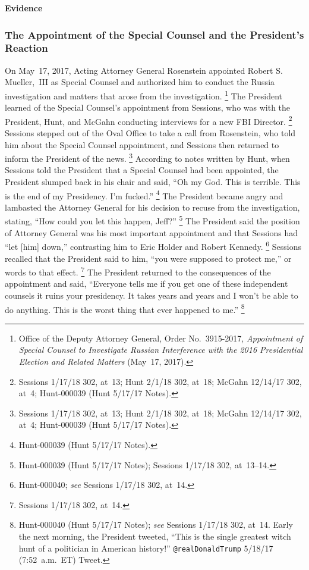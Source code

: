 \begin{center}
\textbf{Evidence}
\end{center}

\subsubsection{The Appointment of the Special Counsel and the President's Reaction}

On May~17, 2017, Acting Attorney General Rosenstein appointed Robert S. Mueller,~III as Special Counsel and authorized him to conduct the Russia investigation and matters that arose from the investigation.%
\footnote{Office of the Deputy Attorney General, Order No.~3915-2017, \textit{Appointment of Special Counsel to Investigate Russian Interference with the 2016 Presidential Election and Related Matters} (May~17, 2017).}
The President learned of the Special Counsel's appointment from Sessions, who was with the President, Hunt, and McGahn conducting interviews for a new FBI Director.%
\footnote{Sessions 1/17/18 302, at~13;
Hunt 2/1/18 302, at~18;
McGahn 12/14/17 302, at~4;
Hunt-000039 (Hunt 5/17/17 Notes).}
Sessions stepped out of the Oval Office to take a call from Rosenstein, who told him about the Special Counsel appointment, and Sessions then returned to inform the President of the news.%
\footnote{Sessions 1/17/18 302, at~13;
Hunt 2/1/18 302, at~18;
McGahn 12/14/17 302, at~4;
Hunt-000039 (Hunt 5/17/17 Notes).}
According to notes written by Hunt, when Sessions told the President that a Special Counsel had been appointed, the President slumped back in his chair and said, ``Oh my God.
This is terrible.
This is the end of my Presidency.
I'm fucked.''%
\footnote{Hunt-000039 (Hunt 5/17/17 Notes).}
The President became angry and lambasted the Attorney General for his decision to recuse from the investigation, stating, ``How could you let this happen, Jeff?''%
\footnote{Hunt-000039 (Hunt 5/17/17 Notes);
Sessions 1/17/18 302, at~13--14.}
The President said the position of Attorney General was his most important appointment and that Sessions had ``let [him] down,'' contrasting him to Eric Holder and Robert Kennedy.%
\footnote{Hunt-000040;
\textit{see} Sessions 1/17/18 302, at~14.}
Sessions recalled that the President said to him, ``you were supposed to protect me,'' or words to that effect.%
\footnote{Sessions 1/17/18 302, at~14.}
The President returned to the consequences of the appointment and said, ``Everyone tells me if you get one of these independent counsels it ruins your presidency.
It takes years and years and I won't be able to do anything.
This is the worst thing that ever happened to me.''%
\footnote{Hunt-000040 (Hunt 5/17/17 Notes);
\textit{see} Sessions 1/17/18 302, at~14.
Early the next morning, the President tweeted, ``This is the single greatest witch hunt of a politician in American history!''
\verb+@realDonaldTrump+ 5/18/17 (7:52~a.m.~ET) Tweet.}

